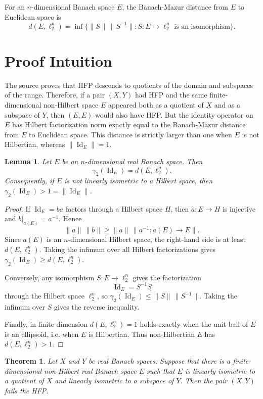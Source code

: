 \documentclass[11pt]{article}
\newtheorem{theorem}{Theorem}
\newtheorem{lemma}{Lemma}
\DeclareMathOperator{\Id}{Id}
\begin{document}
For an $n$-dimensional Banach space $E$, the Banach-Mazur distance from $E$
to Euclidean space is
\[
  d(E,\ell_2^n)=\inf\{\|S\|\,\|S^{-1}\|: S:E\to \ell_2^n
  \text{ is an isomorphism}\}.
\]

\section*{Proof Intuition}

The source proves that HFP descends to quotients of the domain and subspaces
of the range. Therefore, if a pair $(X,Y)$ had HFP and the same
finite-dimensional non-Hilbert space $E$ appeared both as a quotient of $X$
and as a subspace of $Y$, then $(E,E)$ would also have HFP. But the identity
operator on $E$ has Hilbert factorization norm exactly equal to the
Banach-Mazur distance from $E$ to Euclidean space. This distance is strictly
larger than one when $E$ is not Hilbertian, whereas $\|\Id_E\|=1$.

\begin{lemma}\label{lem:identity}
Let $E$ be an $n$-dimensional real Banach space. Then
\[
  \gamma_2(\Id_E)=d(E,\ell_2^n).
\]
Consequently, if $E$ is not linearly isometric to a Hilbert space, then
$\gamma_2(\Id_E)>1=\|\Id_E\|$.
\end{lemma}

\begin{proof}
If $\Id_E=ba$ factors through a Hilbert space $H$, then $a:E\to H$ is
injective and $b|_{a(E)}=a^{-1}$. Hence
\[
  \|a\|\,\|b\|\geq \|a\|\,\|a^{-1}:a(E)\to E\|.
\]
Since $a(E)$ is an $n$-dimensional Hilbert space, the right-hand side is at
least $d(E,\ell_2^n)$. Taking the infimum over all Hilbert factorizations
gives $\gamma_2(\Id_E)\geq d(E,\ell_2^n)$.

Conversely, any isomorphism $S:E\to \ell_2^n$ gives the factorization
\[
  \Id_E = S^{-1}S
\]
through the Hilbert space $\ell_2^n$, so
$\gamma_2(\Id_E)\leq \|S\|\,\|S^{-1}\|$. Taking the infimum over $S$ gives
the reverse inequality.

Finally, in finite dimension $d(E,\ell_2^n)=1$ holds exactly when the unit
ball of $E$ is an ellipsoid, i.e. when $E$ is Hilbertian. Thus non-Hilbertian
$E$ has $d(E,\ell_2^n)>1$.
\end{proof}

\begin{theorem}\label{thm:main}
Let $X$ and $Y$ be real Banach spaces. Suppose that there is a finite-
dimensional non-Hilbert real Banach space $E$ such that $E$ is linearly
isometric to a quotient of $X$ and linearly isometric to a subspace of $Y$.
Then the pair $(X,Y)$ fails the HFP.
\end{theorem}
\end{document}
